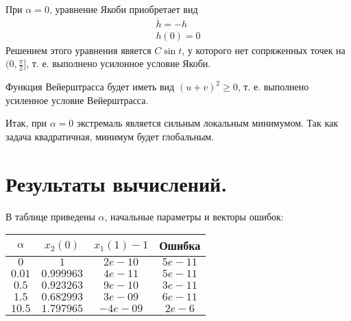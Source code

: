 \documentclass{article}
\begin{document}
При $\alpha = 0$, уравнение Якоби приобретает вид
\begin{gather*}
  \ddot h = -h\\
  h(0) = 0
\end{gather*}
Решением этого уравнения явяется $C\sin t$, у которого нет сопряженных точек на $(0, \frac \pi 2]$, т. е. выполнено усилонное
условие Якоби.

Функция Вейерштрасса будет иметь вид $(u + v)^{2}\ge 0$, т. е. выполнено усиленное условие Вейерштрасса.

Итак, при $\alpha = 0$ экстремаль является сильным локальным минимумом. Так как задача квадратичная, минимум будет глобальным.
\section{Результаты вычислений.}
В таблице приведены $\alpha$, начальные параметры и векторы ошибок:

\begin{tabular}{|c|c|c|c|}
  \hline
   $\alpha$ & $x_{2}(0)$ & $x_{1}(1) - 1$ & Ошибка\\
  \hline
    $0$ & $1$ & $2e-10$ & $ 5e-11$\\
    $0.01$ & $0.999963$ &$4e-11$ &$ 5e-11$ \\
    $0.5$ &$0.923263$ &$9e-10$ & $3e-11$ \\
    $1.5$ &$0.682993$ &$3e-09$& $6e-11$\\
    $10.5$ &$1.797965$ &$-4e-09$& $2e-6$\\
  \hline
\end{tabular}
\end{document}
